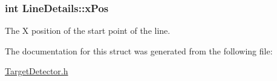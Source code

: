\hypertarget{structLineDetails_acc411b6f69225d2b26c003f23a8e9a83}{}
\subsubsection[{x\+Pos}]{\setlength{\rightskip}{0pt plus 5cm}int Line\+Details\+::x\+Pos}\label{structLineDetails_acc411b6f69225d2b26c003f23a8e9a83}


The X position of the start point of the line. 



The documentation for this struct was generated from the following file\+:\begin{DoxyCompactItemize}
\item 
\hyperlink{TargetDetector_8h}{Target\+Detector.\+h}\end{DoxyCompactItemize}
